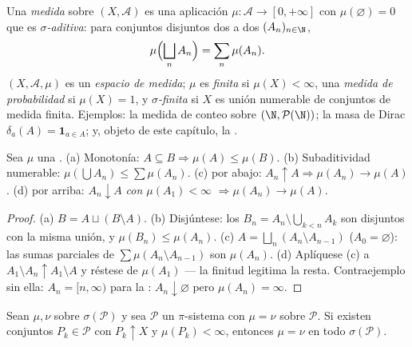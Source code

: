 \begin{definition}\label{def:b3:measure:measure}
Una \emph{medida} sobre $(X, \mathcal A)$ es una
aplicación $\mu \colon \mathcal A \to [0, +\infty]$ con
$\mu(\varnothing)
= 0$ que es \emph{$\sigma$-aditiva}: para conjuntos disjuntos dos a dos
$(A_n)_{n\in\N}$,
\[
\mu\Bigl(\bigsqcup_n A_n\Bigr) = \sum_n \mu(A_n).
\]
$(X, \mathcal A, \mu)$ es un \emph{espacio de medida}; $\mu$ es
\emph{finita} si $\mu(X) < \infty$, una \emph{medida de probabilidad} si
$\mu(X) = 1$, y \emph{$\sigma$-finita} si $X$ es unión numerable de
conjuntos de medida finita. Ejemplos: la medida de conteo sobre
$(\N, \mathcal P(\N))$; la masa de Dirac $\delta_a(A)
= \mathbf 1_{a \in A}$; y, objeto de este capítulo, la
.
\end{definition}

\begin{proposition}\label{prop:b3:measure:basics}
Sea $\mu$ una . (a) Monotonía:
$A \subseteq B
\Rightarrow \mu(A) \leq \mu(B)$. (b) Subaditividad numerable:
$\mu(\bigcup A_n) \leq \sum\mu(A_n)$. (c)
 por abajo:
$A_n \uparrow A \Rightarrow \mu(A_n) \to \mu(A)$. (d)
 por arriba:
$A_n \downarrow A$ \emph{con
$\mu(A_1) < \infty$} $\Rightarrow \mu(A_n) \to \mu(A)$.
\end{proposition}

\begin{proof}
(a) $B = A \sqcup (B\setminus A)$. (b) Disjúntese: los $B_n = A_n
\setminus \bigcup_{k<n}A_k$ son disjuntos con la misma unión, y
$\mu(B_n) \leq \mu(A_n)$. (c) $A = \bigsqcup_n (A_n
\setminus A_{n-1})$ ($A_0 = \varnothing$): las sumas parciales de
$\sum\mu(A_n\setminus A_{n-1})$ son $\mu(A_n)$. (d) Aplíquese (c) a
$A_1 \setminus A_n \uparrow A_1 \setminus A$ y réstese de $\mu(A_1)$ ---
la finitud legitima la resta. Contraejemplo sin ella:
$A_n = [n, \infty)$ para la : $A_n \downarrow \varnothing$ pero $\mu(A_n) =
\infty$.
\end{proof}

\begin{theorem}[Unicidad]\label{thm:b3:measure:uniqueness}
Sean $\mu, \nu$  sobre
$\sigma(\mathcal P)$ y sea $\mathcal
P$ un $\pi$-sistema con $\mu = \nu$ sobre $\mathcal P$. Si existen
conjuntos $P_k \in \mathcal P$ con $P_k \uparrow X$ y
$\mu(P_k) < \infty$, entonces $\mu = \nu$ en todo
$\sigma(\mathcal P)$.
\end{theorem}

